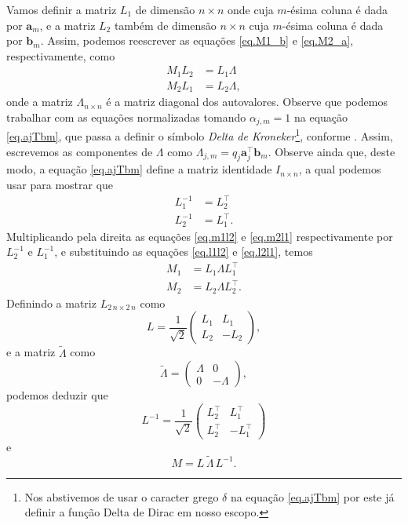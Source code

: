 Vamos definir a matriz $L_1$ de dimens\~ao $n\times n$ onde cuja $m$-\'esima coluna \'e dada por $\mathbf{a}_m$, e a matriz $L_2$ tamb\'em de dimens\~ao $n\times n$ cuja $m$-\'esima coluna \'e dada por $\mathbf{b}_m$. Assim, podemos reescrever as equa\c{c}\~oes \ref{eq.M1_b} e \ref{eq.M2_a}, respectivamente, como
\begin{align}\label{eq.m1l2}
M_1L_2&=L_1\Lambda\\\label{eq.m2l1}
M_2L_1&=L_2\Lambda,
\end{align}
onde a matriz $\Lambda_{n\times n}$ \'e a matriz diagonal dos autovalores. Observe que podemos trabalhar com as equa\c{c}\~oes normalizadas tomando $\alpha_{j,m}=1$ na equa\c{c}\~ao \ref{eq.ajTbm}, que passa a definir o s\'imbolo \textit{Delta de Kroneker}\footnote{Nos abstivemos de usar o caracter grego $\delta$ na equa\c{c}\~ao \ref{eq.ajTbm} por este j\'a definir a fun\c{c}\~ao Delta de Dirac em nosso escopo.}, conforme \cite{lebedev_2003}. Assim, escrevemos as componentes de $\Lambda$ como $\Lambda_{j,m}=q_j\mathbf{a}_j^\top\mathbf{b}_m$. Observe ainda que, deste modo, a equa\c{c}\~ao \ref{eq.ajTbm} define a matriz identidade $I_{n\times n}$, a qual podemos usar para mostrar que
\begin{align}\label{eq.l1l2}
L_1^{-1}&=L_2^\top\\\label{eq.l2l1}
L_2^{-1}&=L_1^\top.
\end{align}
Multiplicando pela direita as equa\c{c}\~oes \ref{eq.m1l2} e \ref{eq.m2l1} respectivamente por $L_2^{-1}$ e $L_1^{-1}$, e substituindo as equa\c{c}\~oes \ref{eq.l1l2} e \ref{eq.l2l1}, temos
\begin{align}
M_1&=L_1\Lambda L_1^\top\\
M_2&=L_2\Lambda L_2^\top.
\end{align}
Definindo a matriz $L_{2\,n\times 2\,n}$ como
\begin{equation}\label{eq.matriz_L}
L=\frac{1}{\sqrt{2}}
\begin{pmatrix}
L_1&L_1\\
L_2&-L_2
\end{pmatrix},
\end{equation}
e a matriz $\tilde{\Lambda}$ como
\begin{equation}\label{eq.tildeLambda}
\tilde{\Lambda}=
\begin{pmatrix}
\Lambda&0\\
0&-\Lambda
\end{pmatrix},
\end{equation}
podemos deduzir que
\begin{equation}\label{eq.L^-1}
L^{-1}=\frac{1}{\sqrt{2}}
\begin{pmatrix}
L_2^\top&L_1^\top\\
L_2^\top&-L_1^\top
\end{pmatrix}
\end{equation}
e
\begin{equation}\label{eq.m_semelhante_lambda}
M=L\,\tilde{\Lambda}\,L^{-1}.
\end{equation}

